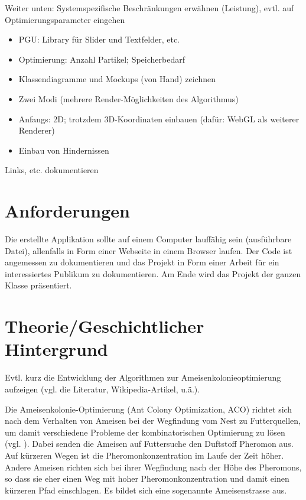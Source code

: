 \vspace*{1cm}

Weiter unten: Systemspezifische Beschränkungen erwähnen (Leistung), evtl. auf Optimierungsparameter eingehen

\vspace*{1cm} 

\begin{itemize}[noitemsep]
\item PGU: Library für Slider und Textfelder, etc.
\item Optimierung: Anzahl Partikel; Speicherbedarf
\item Klassendiagramme und Mockups (von Hand) zeichnen
\item Zwei Modi (mehrere Render-Möglichkeiten des Algorithmus)
\item Anfangs: 2D; trotzdem 3D-Koordinaten einbauen (dafür: WebGL als weiterer Renderer)
\item Einbau von Hindernissen
\end{itemize}


Links, etc. dokumentieren \\


\vspace*{1cm}




\section{Anforderungen}

Die erstellte Applikation sollte auf einem Computer lauffähig sein (ausführbare Datei), allenfalls in Form einer Webseite in einem Browser laufen. Der Code ist angemessen zu dokumentieren und das Projekt in Form einer Arbeit für ein interessiertes Publikum zu dokumentieren. Am Ende wird das Projekt der ganzen Klasse präsentiert. \\





\section{Theorie/Geschichtlicher Hintergrund} 

Evtl. kurz die Entwicklung der Algorithmen zur Ameisenkolonieoptimierung aufzeigen (vgl. die Literatur, Wikipedia-Artikel, u.ä.).


Die Ameisenkolonie-Optimierung (Ant Colony Optimization, ACO) richtet sich nach dem Verhalten von Ameisen bei der Wegfindung vom Nest zu Futterquellen, um damit verschiedene Probleme der kombinatorischen Optimierung zu lösen (vgl. \cite[S. 1]{sch-koa}). Dabei senden die Ameisen auf Futtersuche den Duftstoff Pheromon aus. Auf kürzeren Wegen ist die Pheromonkonzentration im Laufe der Zeit höher. Andere Ameisen richten sich bei ihrer Wegfindung nach der Höhe des Pheromons, so dass sie eher einen Weg mit hoher Pheromonkonzentration und damit einen kürzeren Pfad einschlagen. Es bildet sich eine sogenannte Ameisenstrasse aus.

